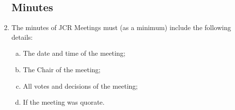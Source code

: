 \documentclass[12pt]{article}
\begin{document}
\begin{enumerate}
    \subsection{Minutes}
    \item The minutes of JCR Meetings must (as a minimum) include the following details:
    \begin{enumerate}[(a)]
        \item The date and time of the meeting;
        \item The Chair of the meeting;
        \item All votes and decisions of the meeting;
        \item If the meeting was quorate.
    \end{enumerate}
\end{enumerate}
\newpage
\end{document}
